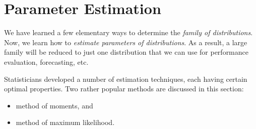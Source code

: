 \section{Parameter Estimation}
\label{sec:parameter-estimation}

We have learned a few elementary ways to determine the \textit{family of distributions}. Now, we learn how to \textit{estimate parameters of distributions}. As a result, a large family will be reduced to just one distribution that we can use for performance evaluation, forecasting, etc.

Statisticians developed a number of estimation techniques, each having certain optimal properties. Two rather popular methods are discussed in this section:
\begin{itemize}
  \item method of moments, and
  \item method of maximum likelihood.
\end{itemize}






